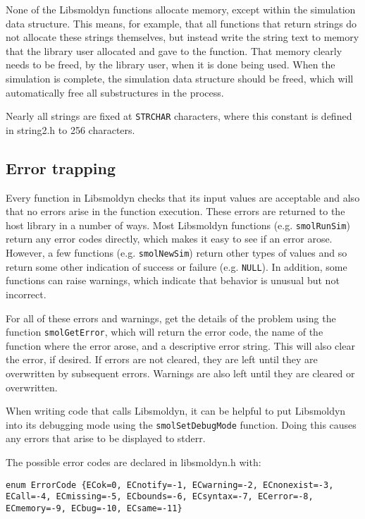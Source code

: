 \documentclass {scrbook}
\newcommand {\ttt} {\texttt}
\begin{document}
None of the Libsmoldyn functions allocate memory, except within the simulation data structure. This means, for example, that all functions that return strings do not allocate these strings themselves, but instead write the string text to memory that the library user allocated and gave to the function. That memory clearly needs to be freed, by the library user, when it is done being used. When the simulation is complete, the simulation data structure should be freed, which will automatically free all substructures in the process.

Nearly all strings are fixed at \ttt{STRCHAR} characters, where this constant is defined in string2.h to 256 characters.


\subsection*{Error trapping}

Every function in Libsmoldyn checks that its input values are acceptable and also that no errors arise in the function execution. These errors are returned to the host library in a number of ways. Most Libsmoldyn functions (e.g. \ttt{smolRunSim}) return any error codes directly, which makes it easy to see if an error arose. However, a few functions (e.g. \ttt{smolNewSim}) return other types of values and so return some other indication of success or failure (e.g. \ttt{NULL}). In addition, some functions can raise warnings, which indicate that behavior is unusual but not incorrect.

For all of these errors and warnings, get the details of the problem using the function \ttt{smolGetError}, which will return the error code, the name of the function where the error arose, and a descriptive error string. This will also clear the error, if desired. If errors are not cleared, they are left until they are overwritten by subsequent errors. Warnings are also left until they are cleared or overwritten.

When writing code that calls Libsmoldyn, it can be helpful to put Libsmoldyn into its debugging mode using the \ttt{smolSetDebugMode} function. Doing this causes any errors that arise to be displayed to stderr.

The possible error codes are declared in libsmoldyn.h with:

\begin{lstlisting}[style=SSAC]
enum ErrorCode {ECok=0, ECnotify=-1, ECwarning=-2, ECnonexist=-3, ECall=-4, ECmissing=-5, ECbounds=-6, ECsyntax=-7, ECerror=-8, ECmemory=-9, ECbug=-10, ECsame=-11}
\end{lstlisting}
\end{document}

